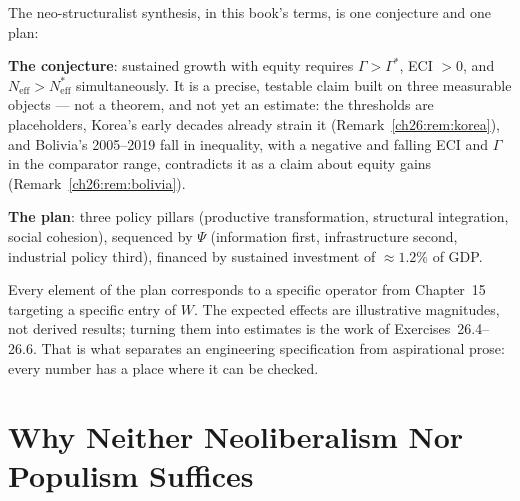 \documentclass[../structural_economics_book.tex]{subfiles}
\begin{document}
\begin{keyinsight}
The neo-structuralist synthesis, in this book's terms, is one conjecture and one plan:

\textbf{The conjecture}: sustained growth with equity requires $\Gamma > \Gamma^*$, ECI $> 0$, and $N_{\text{eff}} > N^*_{\text{eff}}$ simultaneously. It is a precise, testable claim built on three measurable objects --- not a theorem, and not yet an estimate: the thresholds are placeholders, Korea's early decades already strain it (Remark~\ref{ch26:rem:korea}), and Bolivia's 2005--2019 fall in inequality, with a negative and falling ECI and $\Gamma$ in the comparator range, contradicts it as a claim about equity gains (Remark~\ref{ch26:rem:bolivia}).

\textbf{The plan}: three policy pillars (productive transformation, structural integration, social cohesion), sequenced by $\Psi$ (information first, infrastructure second, industrial policy third), financed by sustained investment of $\approx 1.2\%$ of GDP.

Every element of the plan corresponds to a specific operator from Chapter~15 targeting a specific entry of $W$. The expected effects are illustrative magnitudes, not derived results; turning them into estimates is the work of Exercises~26.4--26.6. That is what separates an engineering specification from aspirational prose: every number has a place where it can be checked.
\end{keyinsight}


\section{Why Neither Neoliberalism Nor Populism Suffices}
\label{ch26:sec:neither}
\end{document}
